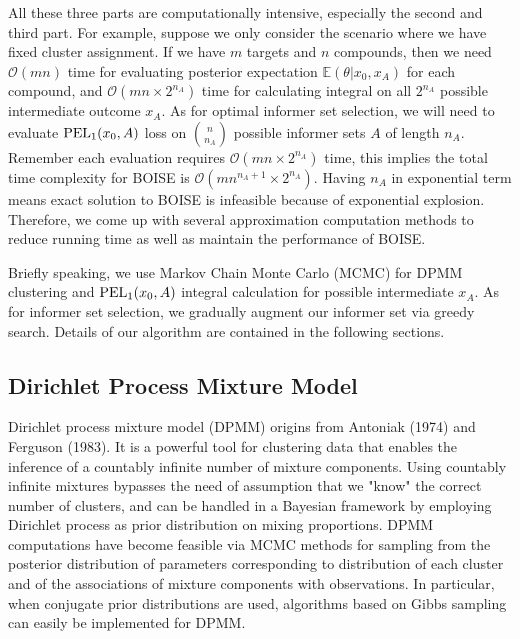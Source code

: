 \documentclass[12pt]{article}
\begin{document}
All these three parts are computationally intensive, especially the second and third part. For example, suppose we only consider the scenario where we have fixed cluster assignment. If we have $m$ targets and $n$ compounds, then we need $\mathcal O(mn)$ time for evaluating posterior expectation  $\mathbb E(\theta|x_0,x_A)$ for each compound, and $\mathcal O(mn\times 2^{n_A})$ time for calculating integral on all $2^{n_A}$ possible intermediate outcome $x_A$. As for optimal informer set selection, we will need to evaluate ${\rm PEL}_1(x_0,A)$ loss on ${n \choose n_A}$ possible informer sets $A$ of length $n_A$. Remember each evaluation requires $\mathcal O(mn\times 2^{n_A})$ time, this implies the total time complexity for BOISE is $\mathcal O(mn^{n_A+1}\times 2^{n_A})$. Having $n_A$ in exponential term means exact solution to BOISE is infeasible because of exponential explosion. Therefore, we come up with several approximation computation methods to reduce running time as well as maintain the performance of BOISE. 

Briefly speaking, we use Markov Chain Monte Carlo (MCMC) for DPMM clustering and ${\rm PEL}_1(x_0,A)$ integral calculation for possible intermediate $x_A$. As for informer set selection, we gradually augment our informer set via greedy search. Details of our algorithm are contained in the following sections. 

\subsection{Dirichlet Process Mixture Model}
Dirichlet process mixture model (DPMM) origins from Antoniak (1974) and Ferguson (1983). It is a powerful tool for clustering data that enables the inference of a countably infinite number of mixture components. Using countably infinite mixtures bypasses the need of assumption that we "know" the correct number of clusters, and can be handled in a Bayesian framework by employing Dirichlet process as prior distribution on mixing proportions. DPMM computations have become feasible via MCMC methods for sampling from the posterior distribution of parameters corresponding to distribution of each cluster and of the associations of mixture components with observations. In particular, when conjugate prior distributions are used, algorithms based on Gibbs sampling can easily be implemented for DPMM.
\end{document}
